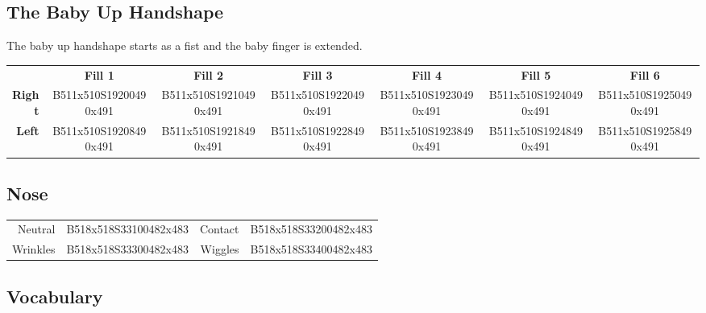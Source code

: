 \documentclass{article}
\begin{document}
\subsection{The Baby Up Handshape}

The baby up handshape starts as a fist and the baby finger is extended.

\begin{center}
\begin{tabular}{r*{6}{c}}
&\textbf{Fill 1}&\textbf{Fill 2}&\textbf{Fill 3}&\textbf{Fill 4}&\textbf{Fill 5}&\textbf{Fill 6}\\
\textbf{Right}&
B511x510S19200490x491&
B511x510S19210490x491&
B511x510S19220490x491&
B511x510S19230490x491&
B511x510S19240490x491&
B511x510S19250490x491\\
\textbf{Left}&
B511x510S19208490x491&
B511x510S19218490x491&
B511x510S19228490x491&
B511x510S19238490x491&
B511x510S19248490x491&
B511x510S19258490x491\\
\end{tabular}
\end{center}

\subsection{Nose}

\begin{center}
\begin{tabular}{rcrc}
Neutral &B518x518S33100482x483&Contact&B518x518S33200482x483\\
Wrinkles&B518x518S33300482x483&Wiggles&B518x518S33400482x483\\
\end{tabular}
\end{center}

\subsection{Vocabulary}
\end{document}
